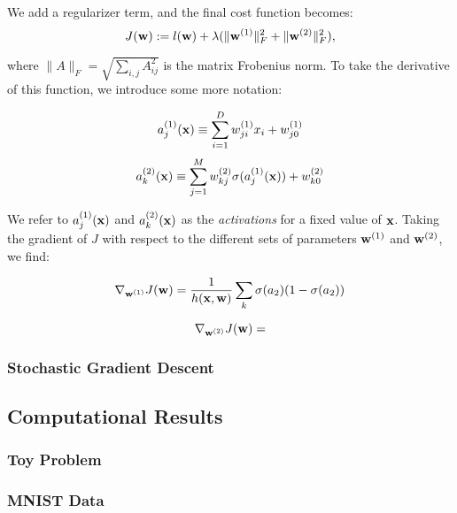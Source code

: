 We add a regularizer term, and the final cost function becomes:
\begin{equation}
J(\boldsymbol{\mathbf{w}}) := l(\boldsymbol{\mathbf{w}}) + \lambda(\|\boldsymbol{\mathbf{w}}^{(1)}\|^2_F + \|\boldsymbol{\mathbf{w}}^{(2)}\|^2_F),
\end{equation}

where $\|A\|_F = \sqrt{\sum_{i,j} A^2_{ij}}$ is the matrix Frobenius norm.  To take the derivative of this function, we introduce some more notation:

\begin{equation}
a^{(1)}_j(\boldsymbol{\mathbf{x}}) \equiv \sum_{i=1}^D w_{ji}^{(1)} x_i + w_{j0}^{(1)}
\end{equation}
\begin{equation}
a^{(2)}_k(\boldsymbol{\mathbf{x}}) \equiv \sum_{j=1}^M w_{kj}^{(2)} \sigma(a^{(1)}_j(\boldsymbol{\mathbf{x}})) + w_{k0}^{(2)}
\end{equation}



We refer to $a^{(1)}_j(\boldsymbol{\mathbf{x}})$ and $a^{(2)}_k(\boldsymbol{\mathbf{x}})$ as the \emph{activations} for a fixed value of $\boldsymbol{\mathbf{x}}$.  Taking the gradient of $J$ with respect to the different sets of parameters $\boldsymbol{\mathbf{w}}^{(1)}$ and $\boldsymbol{\mathbf{w}}^{(2)}$, we find:  

\begin{equation}
\nabla_{\boldsymbol{\mathbf{w}}^{(1)}} J(\boldsymbol{\mathbf{w}}) = \frac{1}{h(\boldsymbol{\mathbf{x}},\boldsymbol{\mathbf{w}})}\sum_k \sigma(a_2) (1 - \sigma(a_2))
\end{equation}

\begin{equation}
\nabla_{\boldsymbol{\mathbf{w}}^{(2)}} J(\boldsymbol{\mathbf{w}}) = 
\end{equation}

\subsubsection{Stochastic Gradient Descent}



\subsection{Computational Results}

\subsubsection{Toy Problem}

\subsubsection{MNIST Data}



